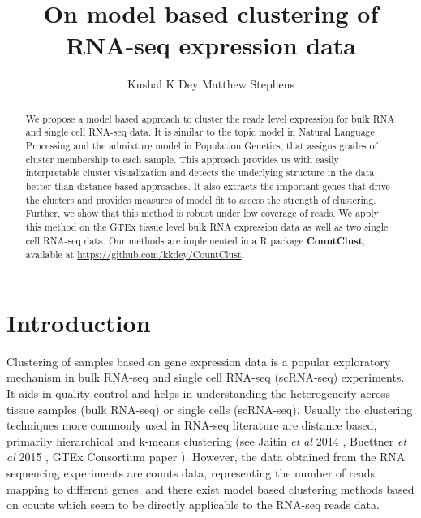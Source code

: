 \title{\Large{\textbf{On model based clustering of RNA-seq expression data}}}
\author{ Kushal K Dey  \qquad Matthew Stephens}

\maketitle

\begin{abstract}
We propose a model based approach to cluster the reads level expression for bulk RNA and single cell RNA-seq data. It is similar to the topic model in Natural Language Processing and the admixture model in Population Genetics, that assigns grades of cluster membership to each sample. This approach provides us with easily interpretable cluster visualization  and  detects the underlying structure in the data better than distance based approaches. It also extracts the important genes that drive the clusters and provides measures of model fit to assess the strength of clustering. Further, we show that this method is robust under low coverage of reads. We apply this method on the GTEx tissue level bulk RNA expression data as well as two single cell RNA-seq data. Our methods are implemented in a R package \textbf{CountClust}, available at \url{https://github.com/kkdey/CountClust}.
\end{abstract}

\section{Introduction}

Clustering of samples based on gene expression data is a popular exploratory mechanism in bulk RNA-seq and single cell RNA-seq (scRNA-seq) experiments. It aids in quality control and helps in understanding the heterogeneity across tissue samples (bulk RNA-seq) or single cells (scRNA-seq). Usually the clustering techniques more commonly used in RNA-seq literature are distance based, primarily hierarchical and k-means clustering (see Jaitin \textit{et al} 2014 \cite{Jaitin2014}, Buettner \textit{et al} 2015 \cite{Buettner2015}, GTEx Consortium paper \cite{GTEX2013}). However, the data obtained from the RNA sequencing experiments are counts data, representing the number of reads mapping to different genes. and there exist model based clustering methods based on counts which seem to be directly applicable to the RNA-seq reads data.  \\[1 pt]

